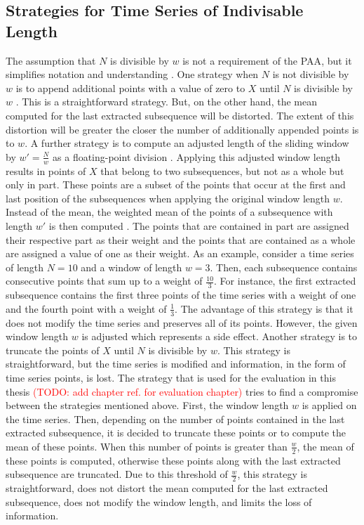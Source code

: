 \subsection*{Strategies for Time Series of Indivisable Length}
The assumption that $N$ is divisible by $w$ is not a requirement of the \ac{PAA}, but it simplifies notation and understanding \cite{PAA_Keogh}. \newline
One strategy when $N$ is not divisible by $w$ is to append additional points with a value of zero to $X$ until $N$ is divisible by $w$ \cite{PAA_Yi_Faloutsos}. This is a straightforward strategy. But, on the other hand, the mean computed for the last extracted subsequence will be distorted. The extent of this distortion will be greater the closer the number of additionally appended points is to $w$. \newline
A further strategy is to compute an adjusted length of the sliding window by $w' = \frac{N}{w}$ as a floating-point division \cite{SAX_Lin}. Applying this adjusted window length results in points of $X$ that belong to two subsequences, but not as a whole but only in part. These points are a subset of the points that occur at the first and last position of the subsequences when applying the original window length $w$. Instead of the mean, the weighted mean of the points of a subsequence with length $w'$ is then computed \cite{SAX_Lin}. The points that are contained in part are assigned their respective part as their weight and the points that are contained as a whole are assigned a value of one as their weight. As an example, consider a time series of length $N = 10$ and a window of length $w = 3$. Then, each subsequence contains consecutive points that sum up to a weight of $\frac{10}{3}$. For instance, the first extracted subsequence contains the first three points of the time series with a weight of one and the fourth point with a weight of $\frac{1}{3}$. The advantage of this strategy is that it does not modify the time series and preserves all of its points. However, the given window length $w$ is adjusted which represents a side effect. \newline
Another strategy is to truncate the points of $X$ until $N$ is divisible by $w$. This strategy is straightforward, but the time series is modified and information, in the form of time series points, is lost. \newline
The strategy that is used for the evaluation in this thesis \textcolor{red}{(TODO: add chapter ref. for evaluation chapter)} tries to find a compromise between the strategies mentioned above. First, the window length $w$ is applied on the time series. Then, depending on the number of points contained in the last extracted subsequence, it is decided to truncate these points or to compute the mean of these points. When this number of points is greater than $\frac{w}{2}$, the mean of these points is computed, otherwise these points along with the last extracted subsequence are truncated. Due to this threshold of $\frac{w}{2}$, this strategy is straightforward, does not distort the mean computed for the last extracted subsequence, does not modify the window length, and limits the loss of information.
